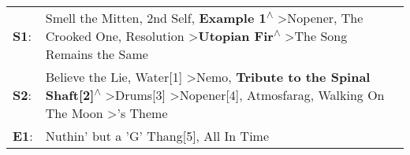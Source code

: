\begin{supertabular}{p{0.03\textwidth}p{0.92\textwidth}}
 \textbf{S1}:  &                                       Smell the Mitten\textsuperscript{}, \enspace 2nd Self\textsuperscript{}, \enspace \textbf{Example 1\textsuperscript{$\wedge$}} \textgreater \enspace Nopener\textsuperscript{}, \enspace The Crooked One\textsuperscript{}, \enspace Resolution\textsuperscript{} \textgreater \enspace \textbf{Utopian Fir\textsuperscript{$\wedge$}} \textgreater \enspace The Song Remains the Same\textsuperscript{}  \enspace  \\
 \textbf{S2}:  &  Believe the Lie\textsuperscript{}, \enspace Water[1]\textsuperscript{} \textgreater \enspace Nemo\textsuperscript{}, \enspace \textbf{Tribute to the Spinal Shaft[2]\textsuperscript{$\wedge$}} \textgreater \enspace Drums[3]\textsuperscript{} \textgreater \enspace Nopener[4]\textsuperscript{}, \enspace Atmosfarag\textsuperscript{}, \enspace Walking On The Moon\textsuperscript{} \textgreater {}'s Theme\textsuperscript{}  \enspace  \\
 \textbf{E1}:  &                                                                                                                                                                                                                                                                                                                                                           Nuthin' but a 'G' Thang[5]\textsuperscript{}, \enspace All In Time\textsuperscript{}  \enspace  \\
\end{supertabular}
